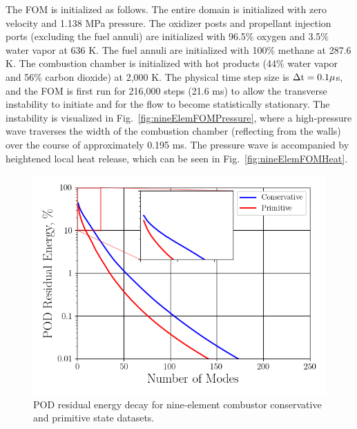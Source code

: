 The FOM is initialized as follows. The entire domain is initialized with zero velocity and 1.138 MPa pressure. The oxidizer posts and propellant injection ports (excluding the fuel annuli) are initialized with 96.5\% oxygen and 3.5\% water vapor at 636 K. The fuel annuli are initialized with 100\% methane at 287.6 K. The combustion chamber is initialized with hot products (44\% water vapor and 56\% carbon dioxide) at 2,000 K. The physical time step size is $\Delta \text{t} = 0.1 \mu$s, and the FOM is first run for 216,000 steps (21.6 ms) to allow the transverse instability to initiate and for the flow to become statistically stationary. The instability is visualized in Fig.~\ref{fig:nineElemFOMPressure}, where a high-pressure wave traverses the width of the combustion chamber (reflecting from the walls) over the course of approximately 0.195 ms. The pressure wave is accompanied by heightened local heat release, which can be seen in Fig.~\ref{fig:nineElemFOMHeat}.

\begin{figure}
	\centering
	\includegraphics[width=0.8\linewidth]{Chapters/HPROMResults/Images/nineElem/nineElem_pod_energy.png}
	\caption{\label{fig:nineElemPODEnergy}POD residual energy decay for nine-element combustor conservative and primitive state datasets.}
\end{figure}

